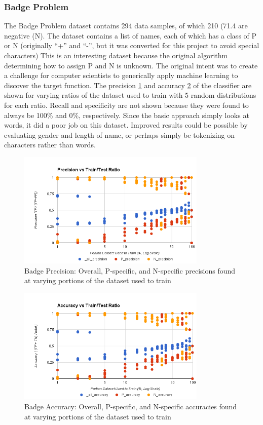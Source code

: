 \subsubsection{Badge Problem}
\label{subsection:badgesBasic}
The Badge Problem dataset \cite{badge} contains 294 data samples, of which 210 (71.4%
are negative (N). The dataset contains a list of names, each of which has a class of P or N (originally ``+'' and ``-'',
but it was converted for this project to avoid special characters) This is an interesting dataset because the original
algorithm determining how to assign P and N is unknown. The original intent was to create a challenge for computer
scientists to generically apply machine learning to discover the target function. The precision
\ref{fig:badgeBasicPrecision} and accuracy \ref{fig:badgeBasicAccuracy} of the classifier are shown for varying ratios
of the dataset used to train with 5 random distributions for each ratio. Recall and specificity are not shown because
they were found to always be 100\% and 0\%, respectively. Since the basic approach simply looks at words, it did a
poor job on this dataset. Improved results could be possible by evaluating gender and length of name, or perhaps
simply be tokenizing on characters rather than words.

\begin{figure}[ht!]
    \centering
    \includegraphics[width=90mm]{img/badge_basic-precision.png}
    \caption{Badge Precision: Overall, P-specific, and N-specific precisions found at varying portions of the dataset used to train}
    \label{fig:badgeBasicPrecision}
\end{figure}

\begin{figure}[ht!]
    \centering
    \includegraphics[width=90mm]{img/badge_basic-accuracy.png}
    \caption{Badge Accuracy: Overall, P-specific, and N-specific accuracies found at varying portions of the dataset used to train}
    \label{fig:badgeBasicAccuracy}
\end{figure}

